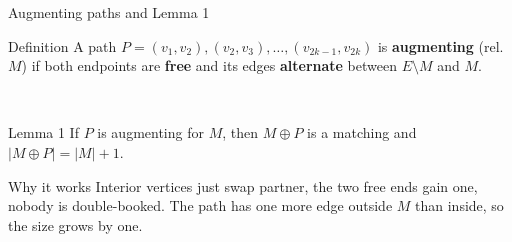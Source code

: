 \documentclass[aspectratio=169,11pt]{beamer}
\newenvironment{plain}[1][In plain words]{\begin{exampleblock}{#1}}{\end{exampleblock}}
\begin{document}
\begin{frame}[t]{Augmenting paths and Lemma 1}
\small
\begin{block}{Definition}
A path $P=(v_1,v_2),(v_2,v_3),\dots,(v_{2k-1},v_{2k})$ is \textbf{augmenting} (rel.\ $M$) if both endpoints are \textbf{free} and its edges \textbf{alternate} between $E\setminus M$ and $M$.
\end{block}
\centering
{}\\[3mm]
\raggedright\vspace{-1mm}
\begin{block}{Lemma 1}
If $P$ is augmenting for $M$, then $M\oplus P$ is a matching and $|M\oplus P|=|M|+1$.
\end{block}
\vspace{1mm}
\begin{plain}[Why it works]
Interior vertices just swap partner, the two free ends gain one, nobody is double-booked. The path has one more edge outside $M$ than inside, so the size grows by one.
\end{plain}
\end{frame}
\end{document}
